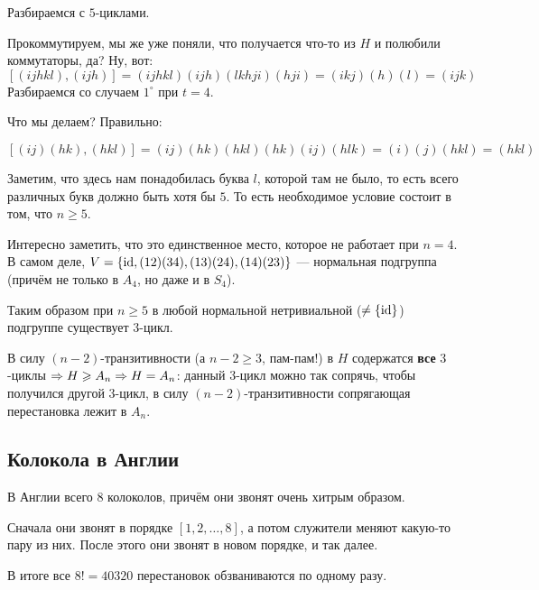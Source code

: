 \documentclass[a4paper]{report}
\begin{document}
{{{        }\ok
        Разбираемся с $5$-циклами.

        Прокоммутируем, мы же уже поняли, что получается что-то из $H$ и полюбили коммутаторы, да? Ну, вот:
        \[[(ijhkl), (ijh)] = (ijhkl)(ijh)(lkhji)(hji)=(ikj)(h)(l) = (ijk)\]
        \ok
        Разбираемся со случаем $1^\circ$ при $t = 4$.

        Что мы делаем? Правильно:

        \[[(ij)(hk),(hkl)]=(ij)(hk)(hkl)(hk)(ij)(hlk)=(i)(j)(hkl) = (hkl)\]

        Заметим, что здесь нам понадобилась буква $l$, которой там не было, то есть всего различных букв должно быть хотя бы $5$.
        То есть необходимое условие состоит в том, что $n\ge 5$.

        Интересно заметить, что это единственное место, которое не работает при $n = 4$.
        В самом деле, $V = \{\operatorname{id}, (12)(34), (13)(24), (14)(23)\}$ --- нормальная подгруппа (причём не только в $A_4$, но даже и в $S_4$).

        \ok
        Таким образом при $n\ge 5$ в любой нормальной нетривиальной ($\ne \{\operatorname{id}\}$) подгруппе существует $3$-цикл.

        В силу $(n-2)$-транзитивности (а $n-2\ge 3$, пам-пам!) в $H$ содержатся \textbf{все} $3$-циклы $\Rightarrow H\geqslant A_n \Rightarrow H = A_n$: данный 3-цикл можно так сопрячь, чтобы получился другой 3-цикл, в силу $(n-2)$-транзитивности сопрягающая перестановка лежит в $A_n$.
    }
    }

    \subsection{Колокола в Англии}
    В Англии всего 8 колоколов, причём они звонят очень хитрым образом.

    Сначала они звонят в порядке $[1, 2, \dots, 8]$, а потом служители меняют какую-то пару из них.
    После этого они звонят в новом порядке, и так далее.

    В итоге все $8! = 40320$ перестановок обзваниваются по одному разу.
\end{document}
